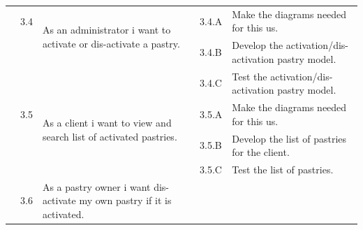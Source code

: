 \documentclass[12pt,a4paper]{report}
\begin{document}
\begin{table}[H]
\begin{center}
\begin{tabular}{|  p{3cm}|  p{1cm}| p{4cm}|  p{1cm}| p{6cm}|}
			
			
			
			
			
			
		\end{tabular}
		
	\end{center}
	
\end{table}
	\begin{table}[H]
		\begin{center}
			\setlength\doublerulesep{0.5pt}
			\begin{tabular}{|  p{3cm}|  p{1cm}| p{4cm}|  p{1cm}| p{6cm}|}
			
				\cline{2-5}  
				
				&                       
				3.4  &  
				\multirow{2}{4cm}{As an administrator i want to activate or dis-activate a pastry.}
				
				&				                      
				3.4.A &                        
				Make the diagrams needed for this \ac{us}.
				\\ 
				\cline{4-5}    
				&                   
				&                                 
				&                        
				3.4.B &                        
				Develop the activation/dis-activation pastry model.
				\\
				\cline{4-5}    
				&                   
				&                                 
				&                        
				3.4.C &                        
				Test the activation/dis-activation pastry model.
				\\
				\cline{2-5}  
				
				&                       
				3.5  &  
				\multirow{2}{4cm}{As a client i want to view and search list of activated pastries.}
				
				&				                      
				3.5.A &                        
				Make the diagrams needed for this \ac{us}.
				\\ 
				\cline{4-5}    
				&                   
				&                                 
				&                        
				3.5.B &                        
				Develop the list of pastries for the client.
				\\ 
				\cline{4-5}    
				&                   
				&                                 
				&                        
				3.5.C & 
				Test the list of pastries.                       
				\\
				\cline{2-5}  
				
				&                       
				3.6  &  
				\multirow{2}{4cm}{As a pastry owner i want dis-activate my own pastry if it is activated.}
				

\end{tabular}
\end{center}
\end{table}
\end{document}
